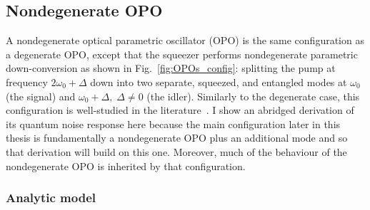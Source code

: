 \subsection{Nondegenerate OPO}
\label{sec:nOPO}


A nondegenerate optical parametric oscillator (OPO) is the same configuration as a degenerate OPO, except that the squeezer performs nondegenerate parametric down-conversion as shown in Fig.~\ref{fig:OPOs_config}: splitting the pump at frequency $2\omega_0+\Delta$ down into two separate, squeezed, and entangled modes at $\omega_0$ (the signal) and $\omega_0+\Delta,\; \Delta\neq0$ (the idler). Similarly to the degenerate case, this configuration is well-studied in the literature~\cite{}. I show an abridged derivation of its quantum noise response here because the main configuration later in this thesis is fundamentally a nondegenerate OPO plus an additional mode and so that derivation will build on this one. Moreover, much of the behaviour of the nondegenerate OPO is inherited by that configuration. %

\subsubsection{Analytic model}


